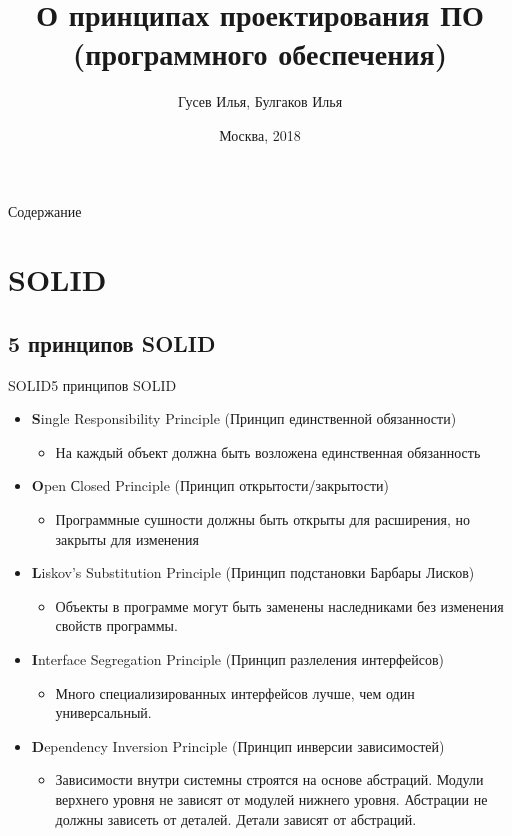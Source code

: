 \documentclass[10pt]{beamer}
\title[\href{https://goo.gl/NRgp8K}{https://goo.gl/NRgp8K} (Term 1)]{О принципах проектирования ПО (программного обеспечения)}
\author[Гусев Илья, Булгаков Илья]{Гусев Илья, Булгаков Илья}
\institute[МФТИ] 
{Московский физико-технический институт\\*}
\date{Москва, 2018}
\begin{document}
\begin{frame}
  \titlepage
\end{frame}

\begin{frame}{Содержание}
\tableofcontents
\end{frame}

\section{SOLID}
\subsection{5 принципов SOLID}
\begin{frame}[fragile]{SOLID}{5 принципов SOLID}
    \begin{itemize}
        \item \textbf{S}ingle Responsibility Principle (Принцип единственной обязанности)
        \begin{itemize}
            \item На каждый объект должна быть возложена единственная обязанность
        \end{itemize}
        \item \textbf{O}pen Сlosed Principle (Принцип открытости/закрытости)
        \begin{itemize}
            \item Программные сушности должны быть открыты для расширения, но закрыты для изменения
        \end{itemize}
        \item \textbf{L}iskov’s Substitution Principle (Принцип подстановки Барбары Лисков)
        \begin{itemize}
            \item Объекты в программе могут быть заменены наследниками без изменения свойств программы.
        \end{itemize}
        \item \textbf{I}nterface Segregation Principle (Принцип разлеления интерфейсов)
        \begin{itemize}
            \item Много специализированных интерфейсов лучше, чем один универсальный.
        \end{itemize}
        \item \textbf{D}ependency Inversion Principle (Принцип инверсии зависимостей)
        \begin{itemize}
            \item Зависимости внутри системны строятся на основе абстраций. Модули верхнего уровня не зависят от модулей нижнего уровня. Абстрации не должны зависеть от деталей. Детали зависят от абстраций.
        \end{itemize}
    \end{itemize}
\end{frame}
\end{document}
